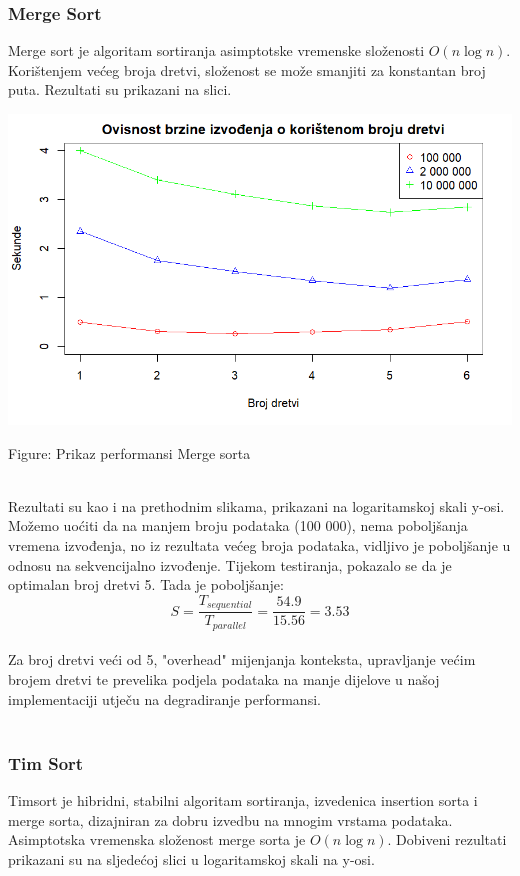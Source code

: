 \documentclass[conference]{IEEEtran}
\begin{document}
\subsubsection{Merge Sort}
Merge sort je algoritam sortiranja asimptotske vremenske složenosti $O(n \log n)$. Korištenjem većeg broja dretvi, složenost se može smanjiti za konstantan broj puta. Rezultati su prikazani na slici.
\\
\noindent
\begin{minipage}{\linewidth}
\centering
\includegraphics[width=1\linewidth]{mergePerf.png}
\caption{Figure: Prikaz performansi Merge sorta}
\label{merge - performance}
\end{minipage}

\\
Rezultati su kao i na prethodnim slikama, prikazani na logaritamskoj skali y-osi. Možemo uoćiti da na manjem broju podataka (100 000), nema poboljšanja vremena izvođenja, no iz rezultata većeg broja podataka, vidljivo je poboljšanje u odnosu na sekvencijalno izvođenje. Tijekom testiranja, pokazalo se da je optimalan broj dretvi 5. Tada je poboljšanje:
\begin{equation}
S = \frac{T_{sequential}}{T_{parallel}}
= \frac{54.9}{15.56} = 3.53
\label{eq:performance}
\end{equation}
\\
Za broj dretvi veći od 5, "overhead" mijenjanja konteksta, upravljanje većim brojem dretvi te prevelika podjela podataka na manje dijelove u našoj implementaciji utječu na degradiranje performansi. 
\\
\\

\subsubsection{Tim Sort}
Timsort je hibridni, stabilni algoritam sortiranja, izvedenica insertion sorta i merge sorta, dizajniran za dobru izvedbu na mnogim vrstama podataka. Asimptotska vremenska složenost merge sorta je $O(n \log n)$. Dobiveni rezultati prikazani su na sljedećoj slici u logaritamskoj skali na y-osi.
\\
\end{document}
